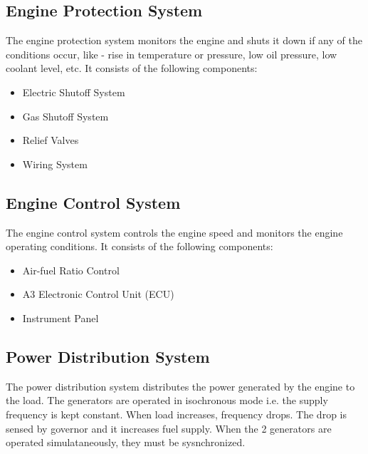 \documentclass[12pt]{article}
\begin{document}
          \subsection*{Engine Protection System}
          The engine protection system monitors the engine and shuts it down if any of the conditions occur, like - rise in temperature or pressure, low oil pressure, low coolant level, etc. It consists of the following components:
          \begin{itemize}
            \item Electric Shutoff System 
            \item Gas Shutoff System
            \item Relief Valves 
            \item Wiring System 
          \end{itemize}

          \subsection*{Engine Control System}
          The engine control system controls the engine speed and monitors the engine operating conditions. It consists of the following components:
          \begin{itemize}
            \item Air-fuel Ratio Control 
            \item A3 Electronic Control Unit (ECU)
            \item Instrument Panel 
          \end{itemize}

          \subsection*{Power Distribution System}
          The power distribution system distributes the power generated by the engine to the load. The generators are operated in isochronous mode i.e. the supply frequency is kept constant. When load increases, frequency drops. The drop is sensed by governor and it increases fuel supply. When the 2 generators are operated simulataneously, they must be sysnchronized.
\end{document}
